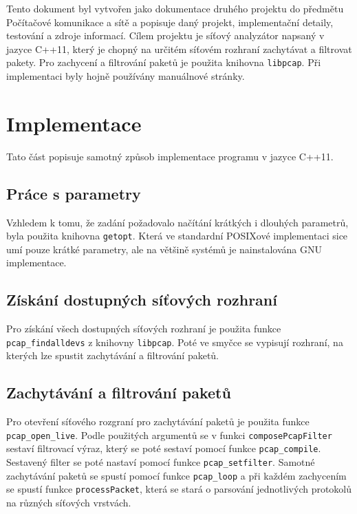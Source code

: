 \documentclass[12pt]{article}
\begin{document}
    Tento dokument byl vytvořen jako dokumentace druhého projektu do předmětu Počítačové komunikace a sítě a popisuje daný projekt, implementační detaily, testování a zdroje informací.
    Cílem projektu je síťový analyzátor napsaný v jazyce C++11, který je chopný na určitém síťovém rozhraní zachytávat a filtrovat pakety.
    Pro zachycení a filtrování paketů je použita knihovna \texttt{libpcap}\cite{libpcap}.
    Při implementaci byly hojně používány manuálnové stránky.

    \section{Implementace}\label{sec:implementace}

    Tato část popisuje samotný způsob implementace programu v jazyce C++11.

    \subsection{Práce s parametry}

    Vzhledem k tomu, že zadání požadovalo načítání krátkých i dlouhých parametrů, byla použita knihovna \texttt{getopt}\cite{man-getopt}.
    Která ve standardní POSIXové implementaci sice umí pouze krátké parametry, ale na většině systémů je nainstalována GNU implementace.

    \subsection{Získání dostupných síťových rozhraní}

    Pro získání všech dostupných síťových rozhraní je použita funkce \texttt{pcap\_findalldevs}\cite{man-pcap-findalldevs} z knihovny \texttt{libpcap}.
    Poté ve smyčce se vypisují rozhraní, na kterých lze spustit zachytávání a filtrování paketů.

    \subsection{Zachytávání a filtrování paketů}

    Pro otevření síťového rozgraní pro zachytávání paketů je použita funkce \texttt{pcap\_open\_live}\cite{man-pcap-open-live}.
    Podle použitých argumentů se v funkci \texttt{composePcapFilter} sestaví filtrovací výraz, který se poté sestaví pomocí funkce \texttt{pcap\_compile}\cite{man-pcap-compile}.
    Sestavený filter se poté nastaví pomocí funkce \texttt{pcap\_setfilter}\cite{man-pcap-setfilter}.
    Samotné zachytávání paketů se spustí pomocí funkce \texttt{pcap\_loop}\cite{man-pcap-loop} a při každém zachycením se spustí funkce \texttt{processPacket}, která se stará o parsování jednotlivých protokolů na různých síťových vrstvách.
\end{document}
